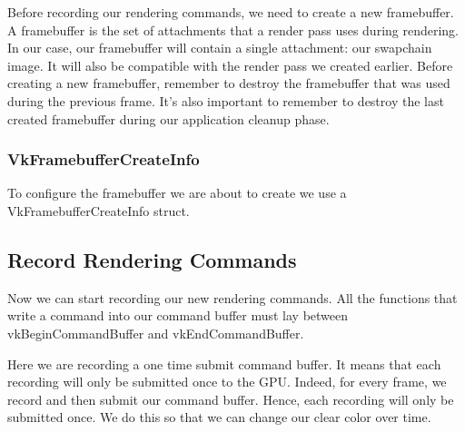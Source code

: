 Before recording our rendering commands, we need to create a new framebuffer.
A framebuffer is the set of attachments that a render pass uses during rendering.
In our case, our framebuffer will contain a single attachment: our swapchain image.
It will also be compatible with the render pass we created earlier.
Before creating a new framebuffer, remember to destroy the framebuffer that was used
during the previous frame.
It's also important to remember to destroy the last created framebuffer during
our application cleanup phase.

\begin{minipage}{\linewidth}{\noindent}
    
\end{minipage}

\subsubsection{VkFramebufferCreateInfo}

To configure the framebuffer we are about to create we use a VkFramebufferCreateInfo
struct.

\begin{minipage}{\linewidth}{\noindent}
    
\end{minipage}

\subsection{Record Rendering Commands}

Now we can start recording our new rendering commands.
All the functions that write a command into our command buffer must lay
between vkBeginCommandBuffer and vkEndCommandBuffer.

\begin{minipage}{\linewidth}{\noindent}
    
\end{minipage}

Here we are recording a one time submit command buffer.
It means that each recording will only be submitted once to the GPU.
Indeed, for every frame, we record and then submit our command buffer.
Hence, each recording will only be submitted once.
We do this so that we can change our clear color over time.


